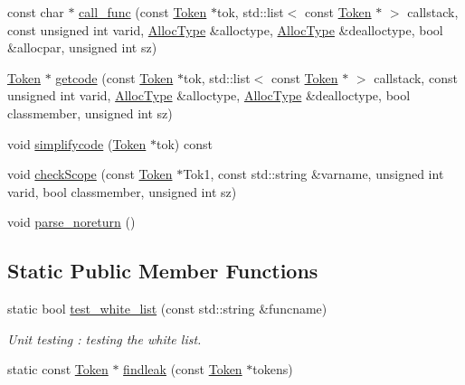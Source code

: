\begin{DoxyCompactItemize}
const char $\ast$ \hyperlink{class_check_memory_leak_in_function_ad5de6453dc31ac22af41b26369bfdce9}{call\-\_\-func} (const \hyperlink{class_token}{Token} $\ast$tok, std\-::list$<$ const \hyperlink{class_token}{Token} $\ast$ $>$ callstack, const unsigned int varid, \hyperlink{class_check_memory_leak_ada9e7f7d0af2d8ba771a42d427f51ede}{Alloc\-Type} \&alloctype, \hyperlink{class_check_memory_leak_ada9e7f7d0af2d8ba771a42d427f51ede}{Alloc\-Type} \&dealloctype, bool \&allocpar, unsigned int sz)
\item 
\hyperlink{class_token}{Token} $\ast$ \hyperlink{class_check_memory_leak_in_function_a801919f8ba79b1ce5d384ba1c2c877b7}{getcode} (const \hyperlink{class_token}{Token} $\ast$tok, std\-::list$<$ const \hyperlink{class_token}{Token} $\ast$ $>$ callstack, const unsigned int varid, \hyperlink{class_check_memory_leak_ada9e7f7d0af2d8ba771a42d427f51ede}{Alloc\-Type} \&alloctype, \hyperlink{class_check_memory_leak_ada9e7f7d0af2d8ba771a42d427f51ede}{Alloc\-Type} \&dealloctype, bool classmember, unsigned int sz)
\item 
void \hyperlink{class_check_memory_leak_in_function_a0a8ea7cea5f1e0bc1f6857c7348c61c9}{simplifycode} (\hyperlink{class_token}{Token} $\ast$tok) const 
\item 
void \hyperlink{class_check_memory_leak_in_function_a4eefe783ba9711813f40557c3a5d36dd}{check\-Scope} (const \hyperlink{class_token}{Token} $\ast$Tok1, const std\-::string \&varname, unsigned int varid, bool classmember, unsigned int sz)
\item 
void \hyperlink{class_check_memory_leak_in_function_a7145c33cb87130c9cb4d622f6c7b5321}{parse\-\_\-noreturn} ()
\end{DoxyCompactItemize}
\subsection*{Static Public Member Functions}
\begin{DoxyCompactItemize}
\item 
static bool \hyperlink{class_check_memory_leak_in_function_ae1337569b44179a2e7f46a4ad9a84738}{test\-\_\-white\-\_\-list} (const std\-::string \&funcname)
\begin{DoxyCompactList}\small\item\em Unit testing \-: testing the white list. \end{DoxyCompactList}\item 
static const \hyperlink{class_token}{Token} $\ast$ \hyperlink{class_check_memory_leak_in_function_a13b0f525339e1b1e4136ffef20ae9eb6}{findleak} (const \hyperlink{class_token}{Token} $\ast$tokens)
\end{DoxyCompactItemize}
